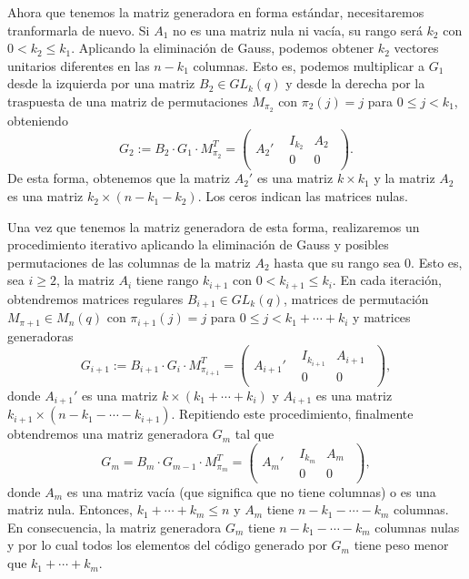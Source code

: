 Ahora que tenemos la matriz generadora en forma estándar, necesitaremos tranformarla de nuevo. Si $A_1$ no es una matriz nula ni vacía, su rango será $k_2$ con $0 < k_2 \leq k_1$. Aplicando la eliminación de Gauss, podemos obtener $k_2$ vectores unitarios diferentes en las $n - k_1$ columnas. Esto es, podemos multiplicar a $G_1$ desde la izquierda por una matriz $B_2 \in GL_k(q)$ y desde la derecha por la traspuesta de una matriz de permutaciones $M_{\pi_2}$ con $\pi_2(j) = j$ para $0 \leq j < k_1$, obteniendo
$$G_2 := B_2 \cdot G_1 \cdot M_{\pi_2}^T = \left( \begin{array}{c|c} A_{2}' & \begin{array}{c|c} I_{k_{2}} & A_{2} \\ \hline  0 & 0 \end{array} \end{array} \right).$$
De esta forma, obtenemos que la matriz $A_2'$ es una matriz $k \times k_1$ y la matriz $A_2$ es una matriz $k_2 \times (n - k_1 - k_2)$. Los ceros indican las matrices nulas.

Una vez que tenemos la matriz generadora de esta forma, realizaremos un procedimiento iterativo aplicando la eliminación de Gauss y posibles permutaciones de las columnas de la matriz $A_2$ hasta que su rango sea 0. Esto es, sea $i \geq 2$, la matriz $A_i$ tiene rango $k_{i+1}$ con $0 < k_{i+1} \leq k_i$. En cada iteración, obtendremos matrices regulares $B_{i+1} \in GL_k(q)$, matrices de permutación $M_{\pi+1} \in M_n(q)$ con $\pi_{i+1}(j) = j$ para $0 \leq j < k_1 + \cdots + k_i$ y matrices generadoras
\[
    G_{i+1} := B_{i+1} \cdot G_i \cdot M_{\pi_{i+1}}^T = \left( \begin{array}{c|c} A_{i+1}' & \begin{array}{c|c} I_{k_{i+1}} & A_{i+1} \\ \hline  0 & 0 \end{array} \end{array} \right),
\]
donde $A_{i+1}'$ es una matriz $k \times (k_1 + \cdots + k_i)$ y $A_{i+1}$ es una matriz $k_{i+1} \times (n - k_1 - \cdots - k_{i+1})$. Repitiendo este procedimiento, finalmente obtendremos una matriz generadora $G_m$ tal que 
\[
    G_{m} = B_m \cdot G_{m-1} \cdot M_{\pi_m}^T = \left( \begin{array}{c|c}  A_{m}' & \begin{array}{c|c}   I_{k_{m}} & A_{m} \\  \hline 0 & 0  \end{array}  \end{array} \right),
\]
donde $A_m$ es una matriz vacía (que significa que no tiene columnas) o es una matriz nula. Entonces, $k_1 + \cdots + k_m \leq n$ y $A_m$ tiene $n - k_1 - \cdots - k_m$ columnas. En consecuencia, la matriz generadora $G_m$ tiene $n - k_1 - \cdots - k_m$ columnas nulas y por lo cual todos los elementos del código generado por $G_m$ tiene peso menor que $k_1 + \cdots + k_m$.


